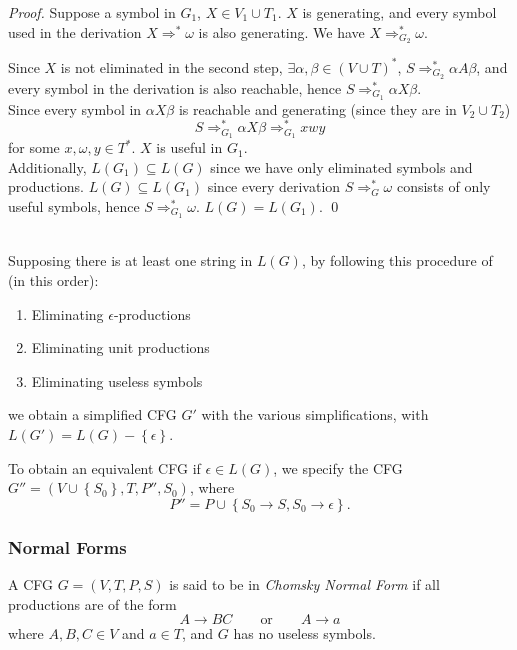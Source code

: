 \begin{proof}
  Suppose a symbol in $G_1$, $X\in V_1\cup T_1$. $X$ is generating, and every
  symbol used in the derivation $X\Rightarrow ^{*}\omega$ is also generating.
  We have $X\Rightarrow_{G_2}^{*}\omega$.

  Since $X$ is not eliminated in the second step, $\exists \alpha,\beta\in
  {\left( V\cup T \right)}^{*}$, $S\Rightarrow_{G_2}^{*} \alpha A\beta$, and
  every symbol in the derivation is also reachable, hence
  $S\Rightarrow_{G_1}^{*}\alpha X\beta$.\\

  Since every symbol in $\alpha X\beta$ is reachable and generating (since they
  are in $V_2\cup T_2$)
  \[S\Rightarrow_{G_1}^{*}\alpha X\beta\Rightarrow_{G_1}^{*}xwy\]
  for some $x,\omega,y\in T^{*}$. $X$ is useful in $G_1$.\\

  Additionally, $L( G_1 ) \subseteq L(G)$ since we have only eliminated symbols
  and productions. $L(G) \subseteq L(G_1)$ since every derivation
  $S\Rightarrow_G^{*}\omega$ consists of only useful symbols, hence
  $S\Rightarrow _{G_1}^{*}\omega$. $L(G)=L(G_1)$. \qed
\end{proof}\\

Supposing there is at least one string in $L(G)$, by following this procedure
of (in this order):
\begin{enumerate}
  \item Eliminating $\epsilon$-productions
  \item Eliminating unit productions
  \item Eliminating useless symbols
\end{enumerate}
we obtain a simplified CFG $G'$ with the various simplifications, with
$L(G')=L(G)-\left\{ \epsilon \right\} $.

\begin{remark}
To obtain an equivalent CFG if $\epsilon\in L(G)$, we specify the CFG $G''=\left( V\cup \left\{ S_0 \right\} ,T,P'', S_0 \right) $, where 
\[P''=P\cup \left\{ S_0\to S, S_0\to\epsilon \right\}.\] 
\end{remark}

\subsubsection{Normal Forms}
\begin{definition}
  A CFG $G=\left( V,T,P,S \right) $ is said to be in \textit{Chomsky Normal
  Form} if all productions are of the form 
  \[A\to BC\qquad\text{or}\qquad A\to a\]
  where $A,B,C\in V$ and $a\in T$, and $G$ has no useless symbols.
\end{definition}

